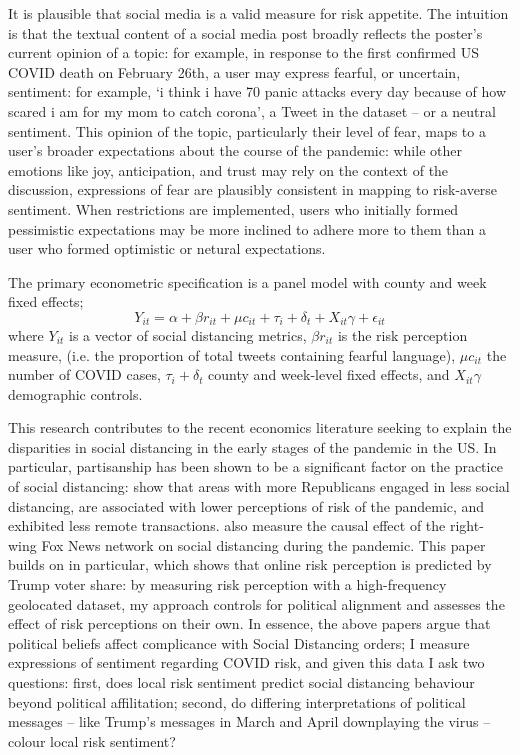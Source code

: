 \documentclass{article}
\begin{document}
It is plausible that social media is a valid measure for risk appetite. The intuition is that the textual content of a social media post broadly reflects the poster's current opinion of a topic: for example, in response to the first confirmed US COVID death on February 26th, a user may express fearful, or uncertain, sentiment: for example, `i think i have 70 panic attacks every day because of how scared i am for my mom to catch corona', a Tweet in the dataset -- or a neutral sentiment. This opinion of the topic, particularly their level of fear, maps to a user's broader expectations about the course of the pandemic: while other emotions like joy, anticipation, and trust may rely on the context of the discussion, expressions of fear are plausibly consistent in mapping to risk-averse sentiment. When restrictions are implemented, users who initially formed pessimistic expectations may be more inclined to adhere more to them than a user who formed optimistic or netural expectations. 

The primary econometric specification is a panel model with county and week fixed effects;
\[Y_{it} = \alpha + \beta r_{it} + \mu c_{it} + \tau_i + \delta_t +  X_{it}\gamma + \epsilon_{it}\]
where \(Y_{it}\) is a vector of social distancing metrics, \(\beta r_{it}\) is the risk perception measure, (i.e. the proportion of total tweets containing fearful language), \(\mu c_{it}\) the number of COVID cases, \(\tau_i + \delta_t\) county and week-level fixed effects, and \(X_{it}\gamma\) demographic controls.

This research contributes to the recent economics literature seeking to explain the disparities in social distancing in the early stages of the pandemic in the US. In particular, partisanship has been shown to be a significant factor on the practice of social distancing: \textcite{allcottPolarizationPublicHealth2020,barriosRiskPerceptionLens2020,painterPoliticalBeliefsAffect2020} show that areas with more Republicans engaged in less social distancing, are associated with lower perceptions of risk of the pandemic, and exhibited less remote transactions. \textcite{simonovPersuasiveEffectFox2020,ananyevSafestTimeFly2020} also measure the causal effect of the right-wing Fox News network on social distancing during the pandemic. This paper builds on \textcite{barriosRiskPerceptionLens2020} in particular, which shows that online risk perception is predicted by Trump voter share: by measuring risk perception with a high-frequency geolocated dataset, my approach controls for political alignment and assesses the effect of risk perceptions on their own. In essence, the above papers argue that political beliefs affect complicance with Social Distancing orders; I measure expressions of sentiment regarding COVID risk, and given this data I ask two questions: first, does local risk sentiment predict social distancing behaviour beyond political affilitation; second, do differing interpretations of political messages -- like Trump's messages in March and April downplaying the virus -- colour local risk sentiment?
\end{document}
